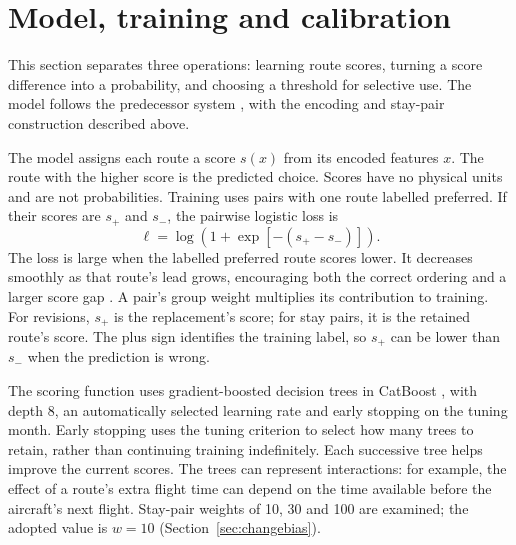 \documentclass[preprint,authoryear,12pt]{elsarticle}
\begin{document}

\section{Model, training and calibration}
\label{sec:model}

This section separates three operations: learning route scores, turning
a score difference into a probability, and choosing a threshold for
selective use. The model follows the predecessor system
\citep{dalmau2024}, with the encoding and stay-pair construction described
above.

The model assigns each route a score $s(x)$ from its encoded features
$x$. The route with the higher score is the predicted choice. Scores have
no physical units and are not probabilities. Training uses pairs with
one route labelled preferred. If their scores are $s_+$ and $s_-$, the
pairwise logistic loss is
\begin{equation}
 \ell=\log\!\left(1+\exp[-(s_+-s_-)]\right).
\end{equation}
The loss is large when the labelled preferred route scores lower.
It decreases smoothly as that route's lead grows, encouraging both the
correct ordering and a larger score gap \citep{burges2005}. A pair's
group weight multiplies its contribution to training. For revisions,
$s_+$ is the replacement's score; for stay pairs, it is the retained
route's score. The plus sign identifies the training label, so $s_+$
can be lower than $s_-$ when the prediction is wrong.

The scoring function uses gradient-boosted decision trees in CatBoost
\citep{prokhorenkova2017}, with depth 8, an automatically selected
learning rate and early stopping on the tuning month. Early stopping
uses the tuning criterion to select how many trees to retain, rather
than continuing training indefinitely. Each successive
tree helps improve the current scores. The trees can represent
interactions: for example, the effect of a route's extra flight time
can depend on the time available before the aircraft's next flight.
Stay-pair weights of 10, 30 and 100 are examined; the adopted value is
$w=10$ (Section~\ref{sec:changebias}).
\end{document}
